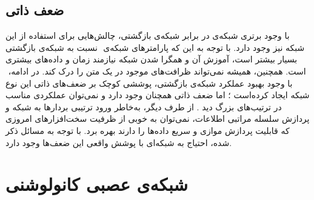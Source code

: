 \subsection{ضعف ذاتی}
با وجود برتری شبکه‌ی  در برابر شبکه‌ی بازگشتی، چالش‌هایی برای استفاده از این شبکه نیز وجود دارد. با توجه به این که پارامترهای شبکه‌ی ‌ نسبت به شبکه‌ی بازگشتی بسیار بیشتر است، آموزش آن و همگرا شدن شبکه نیازمند زمان و داده‌های بیشتری است. همچنین،  همیشه نمی‌تواند ظرافت‌های موجود در یک متن را درک کند. در ادامه، ‌ با وجود بهبود عملکرد شبکه‌ی بازگشتی، پوششی کوچک بر ضعف‌های ذاتی این نوع شبکه ایجاد کرده‌است \cite{info12110442}؛ اما ضعف ذاتی همچنان وجود دارد و نمی‌توان عملکردی مناسب در ترتیب‌های بزرگ دید \cite{VanishingGradient,Kag2020RNNs}. از طرف دیگر، به‌خاطر ورود ترتیبی بردارها به شبکه و پردازش سلسله مراتبی اطلاعات، نمی‌توان به خوبی از ظرفیت سخت‌افزارهای امروزی که قابلیت پردازش موازی و سریع داده‌ها را دارند بهره ‌برد. با توجه به مسائل ذکر شده، احتیاج به شبکه‌ای با پوشش واقعی این ضعف‌ها وجود دارد.
\section{شبکه‌ی عصبی کانولوشنی}

